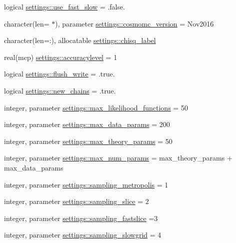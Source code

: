 \begin{DoxyCompactItemize}
\item 
logical \mbox{\hyperlink{namespacesettings_ae20cda2e95f0e537dcbca3b63cb9bb0f}{settings\+::use\+\_\+fast\+\_\+slow}} = .false.
\item 
character(len= $\ast$), parameter \mbox{\hyperlink{namespacesettings_a572023d0201bee3f5560de0fdc96dc4e}{settings\+::cosmomc\+\_\+version}} = \textquotesingle{}Nov2016\textquotesingle{}
\item 
character(len=\+:), allocatable \mbox{\hyperlink{namespacesettings_a493eb241cf271ca0ba4da755bc6b13d1}{settings\+::chisq\+\_\+label}}
\item 
real(mcp) \mbox{\hyperlink{namespacesettings_a815a186f7293c7e58833ae29fee76454}{settings\+::accuracylevel}} = 1
\item 
logical \mbox{\hyperlink{namespacesettings_ae38825eb811eae327d68db37b75023aa}{settings\+::flush\+\_\+write}} = .true.
\item 
logical \mbox{\hyperlink{namespacesettings_ac176aa2a57ff28bd3d05a0a2f2b4defa}{settings\+::new\+\_\+chains}} = .true.
\item 
integer, parameter \mbox{\hyperlink{namespacesettings_a23df6252cfd71721b764c455de43905a}{settings\+::max\+\_\+likelihood\+\_\+functions}} = 50
\item 
integer, parameter \mbox{\hyperlink{namespacesettings_a4d2d308b7b3d47f91cd40d6c735b4d99}{settings\+::max\+\_\+data\+\_\+params}} = 200
\item 
integer, parameter \mbox{\hyperlink{namespacesettings_a7884cd47680ca4079d2177f93eb41772}{settings\+::max\+\_\+theory\+\_\+params}} = 50
\item 
integer, parameter \mbox{\hyperlink{namespacesettings_ab891b6a835eb8706eb0477db68a2c351}{settings\+::max\+\_\+num\+\_\+params}} = max\+\_\+theory\+\_\+params + max\+\_\+data\+\_\+params
\item 
integer, parameter \mbox{\hyperlink{namespacesettings_a7fbe5e0e8194b33c8990365eafe20bed}{settings\+::sampling\+\_\+metropolis}} = 1
\item 
integer, parameter \mbox{\hyperlink{namespacesettings_a3122cb465205f6e3dfbcca05cd8c4d0c}{settings\+::sampling\+\_\+slice}} = 2
\item 
integer, parameter \mbox{\hyperlink{namespacesettings_af8673aadd88b8cfe802aeb29376ec2a6}{settings\+::sampling\+\_\+fastslice}} =3
\item 
integer, parameter \mbox{\hyperlink{namespacesettings_af39c7332606eeaed1affbeb9715b903e}{settings\+::sampling\+\_\+slowgrid}} = 4
\item 

\end{DoxyCompactItemize}
